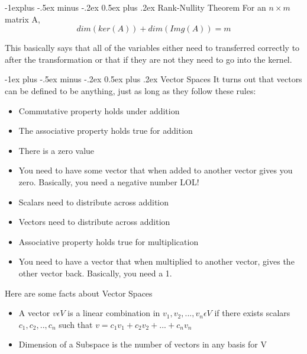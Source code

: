 \documentclass[10pt,landscape]{article}
\makeatletter
\renewcommand{\section}{\@startsection{section}{1}{0mm}%
                                {-1ex plus -.5ex minus -.2ex}%
                                {0.5ex plus .2ex}%
                                {\normalfont\large\bfseries}}
\renewcommand{\subsection}{\@startsection{subsection}{2}{0mm}%
                                {-1explus -.5ex minus -.2ex}%
                                {0.5ex plus .2ex}%
                                {\normalfont\normalsize\bfseries}}
\makeatother
\begin{document}
\begin{multicols}{3}
\subsection{Rank-Nullity Theorem}
For an $n \times m$ matrix A,
\begin{equation*}
    dim(ker(A))+dim(Img(A))=m
\end{equation*}{}

This basically says that all of the variables either need to transferred correctly to after the transformation or that if they are not they need to go into the kernel.

\section{Vector Spaces}
It turns out that vectors can be defined to be anything, just as long as they follow these rules:
\begin{itemize}
    \item Commutative property holds under addition
    \item The associative property holds true for addition
    \item There is a zero value
    \item You need to have some vector that when added to another vector gives you zero. Basically, you need a negative number LOL!
    \item Scalars need to distribute across addition
    \item Vectors need to distribute across addition
    \item Associative property holds true for multiplication
    \item You need to have a vector that when multiplied to another vector, gives the other vector back. Basically, you need a 1.
\end{itemize}{}

Here are some facts about Vector Spaces
\begin{itemize}
    \item A vector $v \epsilon V$ is a linear combination in $v_1,v_2,..., v_n \epsilon V$ if there exists scalars $c_1,c_2,..,c_n$ such that $v=c_1v_1+c_2v_2+...+c_nv_n$
    \item Dimension of a Subspace is the number of vectors in any basis for V
\end{itemize}{}


\end{multicols}
\end{document}
